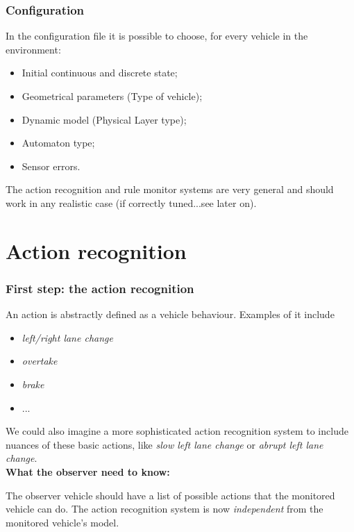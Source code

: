 \documentclass{beamer}
\begin{document}
\begin{frame}
\frametitle{Configuration}

In the configuration file it is possible to choose, for every vehicle in the environment:
\begin{itemize}
\item Initial continuous and discrete state;
\item Geometrical parameters (Type of vehicle);
\item Dynamic model (Physical Layer type);
\item Automaton type;
\item Sensor errors.
\end{itemize}


\bigskip
\bigskip
\bigskip

The action recognition and rule monitor systems are very general and should work in any realistic case (if correctly tuned...see later on).

\end{frame}

\section{Action recognition}


\begin{frame}
\frametitle{First step: the action recognition}
An action is abstractly defined as a vehicle behaviour. Examples of
it include 
\begin{itemize}
\item \textit{left/right lane change}
\item \textit{overtake}
\item \textit{brake}
\item ...
\end{itemize}

We could also imagine a more sophisticated action recognition system
to include nuances of these basic actions, like \textit{slow left lane change} or
\textit{abrupt left lane change}.\\

\textbf{What the observer need to know:}

The observer vehicle should have a list of possible actions that the 
monitored vehicle can do. The action recognition system is now \emph{independent} from the monitored vehicle's model. 
\end{frame}
\end{document}
